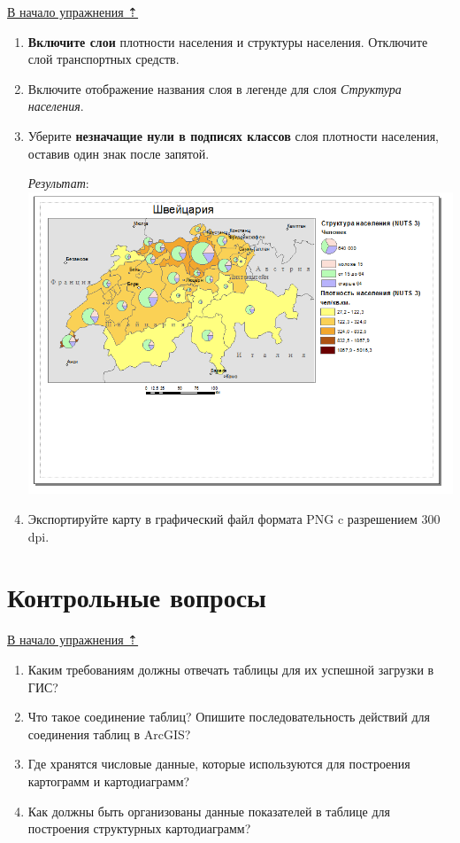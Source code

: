 \documentclass[12pt,]{book}
\begin{document}
\protect\hyperlink{stat-map-economic}{В начало упражнения ⇡}

\begin{enumerate}
\def\labelenumi{\arabic{enumi}.}
\item
  \textbf{Включите слои} плотности населения и структуры населения. Отключите слой транспортных средств.
\item
  Включите отображение названия слоя в легенде для слоя \emph{Структура населения}.
\item
  Уберите \textbf{незначащие нули в подписях классов} слоя плотности населения, оставив один знак после запятой.

  \emph{Результат}:
  \includegraphics{images/Ex08/image34.png}
\item
  Экспортируйте карту в графический файл формата PNG c разрешением 300 dpi.
\end{enumerate}

\hypertarget{stat-map-economic-export-questions}{%
\section{Контрольные вопросы}\label{stat-map-economic-export-questions}}

\protect\hyperlink{stat-map-economic}{В начало упражнения ⇡}

\begin{enumerate}
\def\labelenumi{\arabic{enumi}.}
\item
  Каким требованиям должны отвечать таблицы для их успешной загрузки в ГИС?
\item
  Что такое соединение таблиц? Опишите последовательность действий для соединения таблиц в ArcGIS?
\item
  Где хранятся числовые данные, которые используются для построения картограмм и картодиаграмм?
\item
  Как должны быть организованы данные показателей в таблице для построения структурных картодиаграмм?
\end{enumerate}
\end{document}

